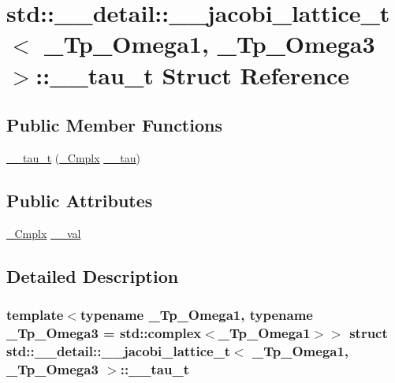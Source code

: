 \hypertarget{structstd_1_1____detail_1_1____jacobi__lattice__t_1_1____tau__t}{}\section{std\+:\+:\+\_\+\+\_\+detail\+:\+:\+\_\+\+\_\+jacobi\+\_\+lattice\+\_\+t$<$ \+\_\+\+Tp\+\_\+\+Omega1, \+\_\+\+Tp\+\_\+\+Omega3 $>$\+:\+:\+\_\+\+\_\+tau\+\_\+t Struct Reference}
\label{structstd_1_1____detail_1_1____jacobi__lattice__t_1_1____tau__t}
\subsection*{Public Member Functions}
\begin{DoxyCompactItemize}
\item 
\hyperlink{structstd_1_1____detail_1_1____jacobi__lattice__t_1_1____tau__t_a041ffb1c096223852676b8928df6192b}{\+\_\+\+\_\+tau\+\_\+t} (\hyperlink{structstd_1_1____detail_1_1____jacobi__lattice__t_a77e286c37544d6ba5e4fb5542d3aad5f}{\+\_\+\+Cmplx} \hyperlink{structstd_1_1____detail_1_1____jacobi__lattice__t_a53604ddbd063b9d71760a0edd7b57e2b}{\+\_\+\+\_\+tau})
\end{DoxyCompactItemize}
\subsection*{Public Attributes}
\begin{DoxyCompactItemize}
\item 
\hyperlink{structstd_1_1____detail_1_1____jacobi__lattice__t_a77e286c37544d6ba5e4fb5542d3aad5f}{\+\_\+\+Cmplx} \hyperlink{structstd_1_1____detail_1_1____jacobi__lattice__t_1_1____tau__t_a00e3e1dca58683668fd457120f83e736}{\+\_\+\+\_\+val}
\end{DoxyCompactItemize}


\subsection{Detailed Description}
\subsubsection*{template$<$typename \+\_\+\+Tp\+\_\+\+Omega1, typename \+\_\+\+Tp\+\_\+\+Omega3 = std\+::complex$<$\+\_\+\+Tp\+\_\+\+Omega1$>$$>$\newline
struct std\+::\+\_\+\+\_\+detail\+::\+\_\+\+\_\+jacobi\+\_\+lattice\+\_\+t$<$ \+\_\+\+Tp\+\_\+\+Omega1, \+\_\+\+Tp\+\_\+\+Omega3 $>$\+::\+\_\+\+\_\+tau\+\_\+t}

